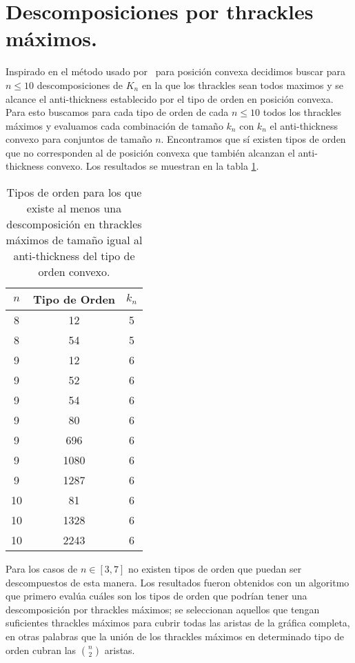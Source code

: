 \section{Descomposiciones por thrackles máximos.}
Inspirado en el método usado por~\cite{Fabila-Monroy2018} para posición convexa
decidimos buscar para $n \leq 10$ descomposiciones de $K_n$ en la que los thrackles
sean todos maximos y se alcance el anti-thickness establecido por el tipo de orden
en posición convexa. Para esto buscamos para cada tipo de orden de cada $n \leq 10$
todos los thrackles máximos y evaluamos cada combinación de tamaño $k_n$ con
$k_n$ el anti-thickness convexo para conjuntos de tamaño $n$. Encontramos que
sí existen tipos de orden que no corresponden al de posición convexa que también
alcanzan el anti-thickness convexo. Los resultados se muestran en la tabla \ref{table:res_desc_th_max}.
\begin{table}[t]
  \centering
  \begin{tabular}{|c|c|c|}
    \hline
    $n$   & Tipo de Orden & $k_n$ \\ \hline\hline
    8 & 12   & 5  \\
    8 & 54   & 5  \\ \hline
    9 & 12   & 6  \\
    9 & 52   & 6  \\
    9 & 54   & 6  \\
    9 & 80   & 6  \\
    9 & 696  & 6  \\
    9 & 1080 & 6  \\
    9 & 1287 & 6  \\ \hline
   10 & 81   & 6  \\
   10 & 1328 & 6  \\
   10 & 2243 & 6  \\ \hline
  \end{tabular}

  \caption{Tipos de orden para los que existe al menos una descomposición en thrackles máximos
  de tamaño igual al anti-thickness del tipo de orden convexo.}
  \label{table:res_desc_th_max}
\end{table}

Para los casos de $n \in [3,7]$ no existen tipos de orden que puedan ser descompuestos
de esta manera. Los resultados fueron obtenidos con un algoritmo que primero evalúa
cuáles son los tipos de orden que podrían tener una descomposición por thrackles máximos;
se seleccionan aquellos que tengan suficientes thrackles máximos para cubrir todas las
aristas de la gráfica completa, en otras palabras que la unión de los thrackles
máximos en determinado tipo de orden cubran las $\binom{n}{2}$ aristas.

